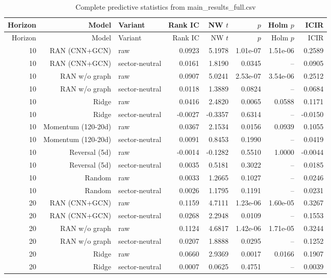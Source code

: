 \documentclass[10pt]{article}
\begin{document}
\begingroup\scriptsize\setlength{\tabcolsep}{2.5pt}
\begin{longtable}{rrlrrrrr}
\caption{Complete predictive statistics from main\_results\_full.csv}\label{tab:fullresults_pred}\\
\toprule
Horizon & Model & Variant & Rank IC & NW $t$ & $p$ & Holm $p$ & ICIR \\
\midrule
\endfirsthead
\toprule
Horizon & Model & Variant & Rank IC & NW $t$ & $p$ & Holm $p$ & ICIR \\
\midrule
\endhead
10 & RAN (CNN+GCN) & raw & 0.0923 & 5.1978 & 1.01e-07 & 1.51e-06 & 0.2589 \\
10 & RAN (CNN+GCN) & sector-neutral & 0.0161 & 1.8190 & 0.0345 & -- & 0.0905 \\
10 & RAN w/o graph & raw & 0.0907 & 5.0241 & 2.53e-07 & 3.54e-06 & 0.2512 \\
10 & RAN w/o graph & sector-neutral & 0.0118 & 1.3889 & 0.0824 & -- & 0.0684 \\
10 & Ridge & raw & 0.0416 & 2.4820 & 0.0065 & 0.0588 & 0.1171 \\
10 & Ridge & sector-neutral & -0.0027 & -0.3357 & 0.6314 & -- & -0.0150 \\
10 & Momentum (120-20d) & raw & 0.0367 & 2.1534 & 0.0156 & 0.0939 & 0.1055 \\
10 & Momentum (120-20d) & sector-neutral & 0.0091 & 0.8453 & 0.1990 & -- & 0.0419 \\
10 & Reversal (5d) & raw & -0.0014 & -0.1282 & 0.5510 & 1.0000 & -0.0044 \\
10 & Reversal (5d) & sector-neutral & 0.0035 & 0.5181 & 0.3022 & -- & 0.0185 \\
10 & Random & raw & 0.0033 & 1.2665 & 0.1027 & -- & 0.0246 \\
10 & Random & sector-neutral & 0.0026 & 1.1795 & 0.1191 & -- & 0.0231 \\
20 & RAN (CNN+GCN) & raw & 0.1159 & 4.7111 & 1.23e-06 & 1.60e-05 & 0.3267 \\
20 & RAN (CNN+GCN) & sector-neutral & 0.0268 & 2.2948 & 0.0109 & -- & 0.1553 \\
20 & RAN w/o graph & raw & 0.1124 & 4.6817 & 1.42e-06 & 1.71e-05 & 0.3244 \\
20 & RAN w/o graph & sector-neutral & 0.0207 & 1.8888 & 0.0295 & -- & 0.1252 \\
20 & Ridge & raw & 0.0660 & 2.9369 & 0.0017 & 0.0166 & 0.1907 \\
20 & Ridge & sector-neutral & 0.0007 & 0.0625 & 0.4751 & -- & 0.0039 \\

\end{longtable}
\end{document}
